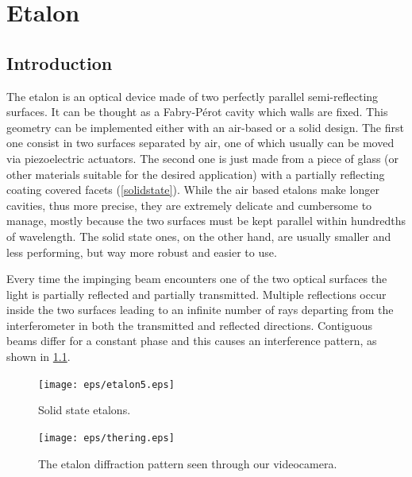 \chapter{Etalon}\label{etalon}
	\section{Introduction}
The etalon is an optical device made of two perfectly parallel semi-reflecting surfaces. It can be thought as a Fabry-P\'erot cavity which walls are fixed. This geometry can be implemented either with an air-based or a solid design. The first one consist in two surfaces separated by air, one of which usually can be moved via piezoelectric actuators. The second one is just made from a piece of glass (or other materials suitable for the desired application) with a partially reflecting coating covered facets (\cref{solidstate}). While the air based etalons make longer cavities, thus more precise, they are extremely delicate and cumbersome to manage, mostly because the two surfaces must be kept parallel within hundredths of wavelength. The solid state ones, on the other hand, are usually smaller and less performing, but way more robust and easier to use.

Every time the impinging beam encounters one of the two optical surfaces the light is partially reflected and partially transmitted. Multiple reflections occur inside the two surfaces leading to an infinite number of rays departing from the interferometer in both the transmitted and reflected directions. Contiguous beams differ for a constant phase and this causes an interference pattern, as shown in \cref{etalonmonitor}.

\begin{figure}[!hbt]\centering
\begin{minipage}[t]{0.46\textwidth}\centering
\texttt{[image: eps/etalon5.eps]}
\caption{Solid state etalons.}
\label{solidstate}
\end{minipage}
\hfill
\begin{minipage}[t]{0.46\textwidth}\centering
\texttt{[image: eps/thering.eps]}
\caption{The etalon diffraction pattern seen through our videocamera.}
\label{etalonmonitor}
\end{minipage}
\end{figure}

